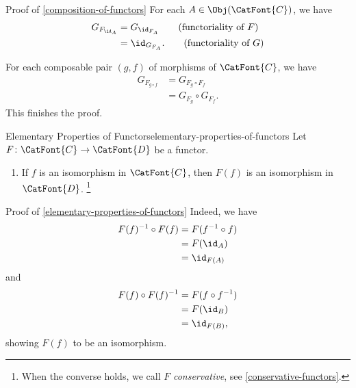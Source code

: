 \begin{Proof}{Proof of \cref{composition-of-functors}}%
    For each $A\in\Obj(\CatFont{C})$, we have
    \begin{align*}
        G_{F_{\id_{A}}} &= G_{\id_{F_{A}}}\tag{functoriality of $F$}\\
                        &= \id_{G_{F_{A}}}.\tag{functoriality of $G$}
    \end{align*}

    For each composable pair $(g,f)$ of morphisms of $\CatFont{C}$, we have
    \begin{align*}
        G_{F_{g\circ f}} &= G_{F_{g}\circ F_{f}}\tag{functoriality of $F$}\\
                         &= G_{F_{g}}\circ G_{F_{f}}.\tag{functoriality of $G$}
    \end{align*}
    This finishes the proof.
\end{Proof}
\begin{proposition}{Elementary Properties of Functors}{elementary-properties-of-functors}%
    Let $F\colon\CatFont{C}\to\CatFont{D}$ be a functor.
    \begin{enumerate}
        \item\label{elementary-properties-of-functors-preservation-of-isomorphisms}If $f$ is an isomorphism in $\CatFont{C}$, then $F(f)$ is an isomorphism in $\CatFont{D}$.%
            \footnote{%
                When the converse holds, we call $F$ \emph{conservative}, see \cref{conservative-functors}.
                \par\vspace*{-1.75\baselineskip}
            }%
    \end{enumerate}
\end{proposition}
\begin{Proof}{Proof of \cref{elementary-properties-of-functors}}%
    Indeed, we have
    \begin{align*}
        F(f)^{-1}\circ F(f) &= F(f^{-1}\circ f)\\
                            &= F(\id_{A})\\
                            &= \id_{F(A)}
    \end{align*}
    and
    \begin{align*}
        F(f)\circ F(f)^{-1} &= F(f\circ f^{-1})\\
                            &= F(\id_{B})\\
                            &= \id_{F(B)},
    \end{align*}
    showing $F(f)$ to be an isomorphism.
\end{Proof}
